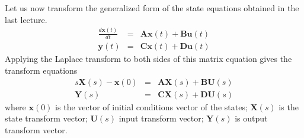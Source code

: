 Let us now transform the generalized form of the state equations
obtained in the last lecture.
\begin{eqnarray*}
  \frac{d\mathbf{x}(t)}{dt} &=&
  \mathbf{A}\mathbf{x}(t)+\mathbf{B}\mathbf{u}(t)\\
  \mathbf{y}(t)&=&\mathbf{C}\mathbf{x}(t)+\mathbf{D}\mathbf{u}(t)
\end{eqnarray*}
Applying the Laplace transform to both sides of this matrix
equation gives the transform equations
\begin{eqnarray*}
  s\mathbf{X}(s)-\mathbf{x}(0) &=&
  \mathbf{A}\mathbf{X}(s)+\mathbf{B}\mathbf{U}(s)\\
  \mathbf{Y}(s)&=&\mathbf{C}\mathbf{X}(s)+\mathbf{D}\mathbf{U}(s)
\end{eqnarray*}
where $\mathbf{x}(0)$ is the vector of initial conditions vector
of the states; $\mathbf{X}(s)$ is the state transform vector;
$\mathbf{U}(s)$ input transform vector; $\mathbf{Y}(s)$ is output
transform vector.

\endinput

